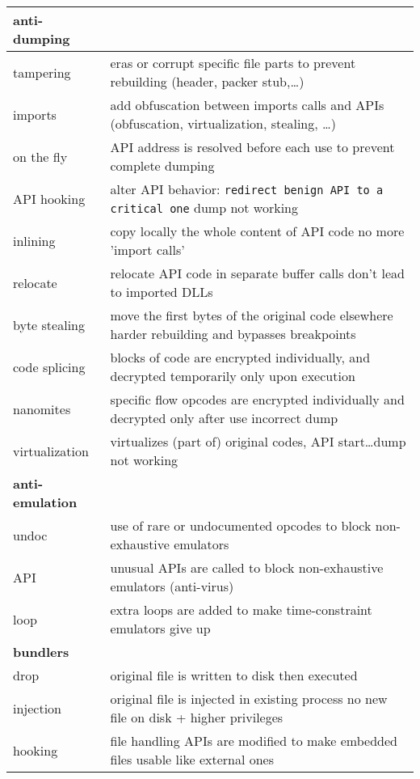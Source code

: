 \begin{tabular}{ll}
\midrule
{\bf anti-dumping} \\
\midrule
tampering		& eras or corrupt specific file parts to prevent rebuilding (header, packer stub,\ldots) \\
imports 		& add obfuscation between imports calls and APIs (obfuscation, virtualization, stealing, \ldots)\\
on the fly		& API address is resolved before each use to prevent complete dumping \\
API hooking		& alter API behavior: {\tt redirect benign API to a critical one} \ra dump not working \\
inlining		& copy locally the whole content of API code \ra no more 'import calls'\\
relocate		& relocate API code in separate buffer \ra calls don't lead to imported DLLs\\
byte stealing	& move the first bytes of the original code elsewhere \ra harder rebuilding and bypasses breakpoints\\
code splicing 	& blocks of code are encrypted individually, and decrypted temporarily only upon execution \\
nanomites		& specific flow opcodes are encrypted individually and decrypted only after use \ra incorrect dump\\
virtualization	& virtualizes (part of) original codes, API start\ldots \ra dump not working \\

\midrule
{\bf anti-emulation} \\
\midrule
undoc			& use of rare or undocumented opcodes to block non-exhaustive emulators \\
API			& unusual APIs are called to block non-exhaustive emulators (anti-virus)\\
loop			& extra loops are added to make time-constraint emulators give up \\
\midrule
{\bf bundlers} \\
\midrule
drop			& original file is written to disk then executed \\
injection		& original file is injected in existing process \ra no new file on disk + higher privileges \\
hooking		& file handling APIs are modified to make embedded files usable like external ones\\

\bottomrule

\end{tabular}


\sig

